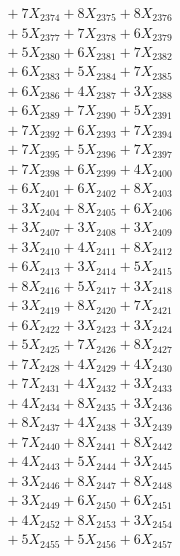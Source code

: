 \documentclass[a4paper,10pt]{article}
\begin{document}
{\begin{align}
&\;  + 7 X_{2374} + 8 X_{2375} + 8 X_{2376} \\[0.3ex]
&\;  + 5 X_{2377} + 7 X_{2378} + 6 X_{2379} \\[0.5ex]\allowbreak
&\;  + 5 X_{2380} + 6 X_{2381} + 7 X_{2382} \\[0.3ex]
&\;  + 6 X_{2383} + 5 X_{2384} + 7 X_{2385} \\[0.3ex]
&\;  + 6 X_{2386} + 4 X_{2387} + 3 X_{2388} \\[0.3ex]
&\;  + 6 X_{2389} + 7 X_{2390} + 5 X_{2391} \\[0.3ex]
&\;  + 7 X_{2392} + 6 X_{2393} + 7 X_{2394} \\[0.3ex]
&\;  + 7 X_{2395} + 5 X_{2396} + 7 X_{2397} \\[0.3ex]
&\;  + 7 X_{2398} + 6 X_{2399} + 4 X_{2400} \\[0.3ex]
&\;  + 6 X_{2401} + 6 X_{2402} + 8 X_{2403} \\[0.3ex]
&\;  + 3 X_{2404} + 8 X_{2405} + 6 X_{2406} \\[0.3ex]
&\;  + 3 X_{2407} + 3 X_{2408} + 3 X_{2409} \\[0.5ex]\allowbreak
&\;  + 3 X_{2410} + 4 X_{2411} + 8 X_{2412} \\[0.3ex]
&\;  + 6 X_{2413} + 3 X_{2414} + 5 X_{2415} \\[0.3ex]
&\;  + 8 X_{2416} + 5 X_{2417} + 3 X_{2418} \\[0.3ex]
&\;  + 3 X_{2419} + 8 X_{2420} + 7 X_{2421} \\[0.3ex]
&\;  + 6 X_{2422} + 3 X_{2423} + 3 X_{2424} \\[0.3ex]
&\;  + 5 X_{2425} + 7 X_{2426} + 8 X_{2427} \\[0.3ex]
&\;  + 7 X_{2428} + 4 X_{2429} + 4 X_{2430} \\[0.3ex]
&\;  + 7 X_{2431} + 4 X_{2432} + 3 X_{2433} \\[0.3ex]
&\;  + 4 X_{2434} + 8 X_{2435} + 3 X_{2436} \\[0.3ex]
&\;  + 8 X_{2437} + 4 X_{2438} + 3 X_{2439} \\[0.5ex]\allowbreak
&\;  + 7 X_{2440} + 8 X_{2441} + 8 X_{2442} \\[0.3ex]
&\;  + 4 X_{2443} + 5 X_{2444} + 3 X_{2445} \\[0.3ex]
&\;  + 3 X_{2446} + 8 X_{2447} + 8 X_{2448} \\[0.3ex]
&\;  + 3 X_{2449} + 6 X_{2450} + 6 X_{2451} \\[0.3ex]
&\;  + 4 X_{2452} + 8 X_{2453} + 3 X_{2454} \\[0.3ex]
&\;  + 5 X_{2455} + 5 X_{2456} + 6 X_{2457} \\[0.3ex]

\end{align}}
\end{document}
